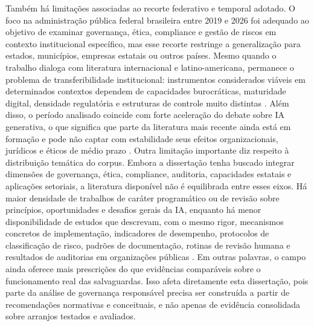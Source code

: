 \documentclass[12pt,a4paper]{article}
\begin{document}
Também há limitações associadas ao recorte federativo e temporal adotado. O foco na administração pública federal brasileira entre 2019 e 2026 foi adequado ao objetivo de examinar governança, ética, compliance e gestão de riscos em contexto institucional específico, mas esse recorte restringe a generalização para estados, municípios, empresas estatais ou outros países. Mesmo quando o trabalho dialoga com literatura internacional e latino-americana, permanece o problema de transferibilidade institucional: instrumentos considerados viáveis em determinados contextos dependem de capacidades burocráticas, maturidade digital, densidade regulatória e estruturas de controle muito distintas \autocite{criado2024inteligencia} \autocite{yiitcanlar2022artificial} \autocite{david2023understanding}. Além disso, o período analisado coincide com forte aceleração do debate sobre IA generativa, o que significa que parte da literatura mais recente ainda está em formação e pode não captar com estabilidade seus efeitos organizacionais, jurídicos e éticos de médio prazo \autocite{mariano2026inteligencia}.
Outra limitação importante diz respeito à distribuição temática do corpus. Embora a dissertação tenha buscado integrar dimensões de governança, ética, compliance, auditoria, capacidades estatais e aplicações setoriais, a literatura disponível não é equilibrada entre esses eixos. Há maior densidade de trabalhos de caráter programático ou de revisão sobre princípios, oportunidades e desafios gerais da IA, enquanto há menor disponibilidade de estudos que descrevam, com o mesmo rigor, mecanismos concretos de implementação, indicadores de desempenho, protocolos de classificação de risco, padrões de documentação, rotinas de revisão humana e resultados de auditorias em organizações públicas \autocite{batool2025ai} \autocite{sigfrids2022how} \autocite{alhosani2024opportunities}. Em outras palavras, o campo ainda oferece mais prescrições do que evidências comparáveis sobre o funcionamento real das salvaguardas. Isso afeta diretamente esta dissertação, pois parte da análise de governança responsável precisa ser construída a partir de recomendações normativas e conceituais, e não apenas de evidência consolidada sobre arranjos testados e avaliados.
\end{document}
